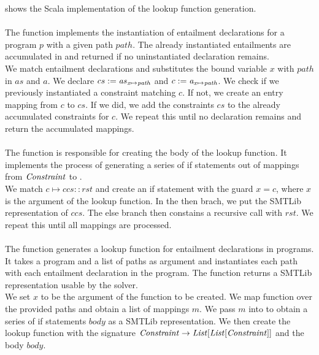 %
 shows the Scala implementation
of the lookup function generation.\\
\\
The function 
implements the instantiation of entailment declarations
for a program $p$ with a given path $path$.
The already instantiated entailments are accumulated
in 
and returned if no uninstantiated declaration remains.\\
%
We match entailment declarations 
and substitutes the bound variable $x$ with $path$ in $as$ and $a$.
We declare $cs := \mathit{as}_{\mathit{x} \mapsto \mathit{path}}$ and $c := \mathit{a}_{\mathit{x} \mapsto \mathit{path}}$.
We check if we previously instantiated a constraint matching $c$.
If not, we create an entry mapping from $c$ to $cs$.
If we did, we add the constraints $cs$ to the already
accumulated constraints for $c$.
We repeat this until no declaration remains
and return the accumulated mappings.\\
\\
The function 
is responsible for creating the body of the lookup function.
It implements the process of generating a series
of if statements out of mappings from $\mathit{Constraint}$ to \Constrss.\\
%
We match $c \mapsto ccs :: rst$
and create an if statement with the guard $x = c$,
where $x$ is the argument of the lookup function.
In the then brach, we put the SMTLib representation of $ccs$.
The else branch then constains a recursive call with $rst$.
We repeat this until all mappings are processed.\\
\\
The function 
generates a lookup function for entailment declarations in programs.
It takes a program and a list of paths as argument
and instantiates each path with each
entailment declaration in the program.
The function returns a SMTLib representation usable by the solver.\\
%
We set $x$ to be the argument of the function to be created.
We map function 
over the provided paths and obtain a list of mappings $m$.
We pass $m$ into 
to obtain a series of if statements $body$ as a SMTLib representation.
We then create the lookup function with the signature
$\mathit{Constraint} \rightarrow \mathit{List[\mathit{List[\mathit{Constraint}]}]}$ and the body $body$.

\newpage
